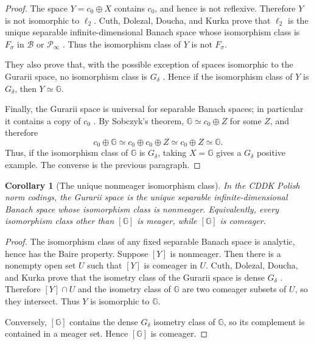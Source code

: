 \documentclass[11pt]{article}
\newtheorem*{corollary}{Corollary}
\begin{document}
\begin{proof}
The space \(Y=c_0\oplus X\) contains \(c_0\), and hence is not reflexive.
Therefore \(Y\) is not isomorphic to \(\ell_2\).  Cuth, Dolezal, Doucha, and
Kurka prove that \(\ell_2\) is the unique separable infinite-dimensional Banach
space whose isomorphism class is \(F_\sigma\) in \(\mathcal B\) or
\(\mathcal P_\infty\) \cite[Theorem 2.10]{CDDK}.  Thus the isomorphism class
of \(Y\) is not \(F_\sigma\).

They also prove that, with the possible exception of spaces isomorphic to the
Gurarii space, no isomorphism class is \(G_\delta\)
\cite[Proposition 2.11]{CDDK}.  Hence if the isomorphism class of \(Y\) is
\(G_\delta\), then \(Y\simeq\mathbb G\).

Finally, the Gurarii space is universal for separable Banach spaces; in
particular it contains a copy of \(c_0\) \cite{BKK}.  By Sobczyk's theorem,
\(\mathbb G\simeq c_0\oplus Z\) for some \(Z\), and therefore
\[
  c_0\oplus \mathbb G\simeq c_0\oplus c_0\oplus Z\simeq c_0\oplus Z\simeq
  \mathbb G.
\]
Thus, if the isomorphism class of \(\mathbb G\) is \(G_\delta\), taking
\(X=\mathbb G\) gives a \(G_\delta\) positive example.  The converse is the
previous paragraph.
\end{proof}

\begin{corollary}[The unique nonmeager isomorphism class]
In the CDDK Polish norm codings, the Gurarii space is the unique separable
infinite-dimensional Banach space whose isomorphism class is nonmeager.
Equivalently, every isomorphism class other than \([\mathbb G]\) is meager,
while \([\mathbb G]\) is comeager.
\end{corollary}

\begin{proof}
The isomorphism class of any fixed separable Banach space is analytic, hence
has the Baire property.  Suppose \([Y]\) is nonmeager.  Then there is a
nonempty open set \(U\) such that \([Y]\) is comeager in \(U\).  Cuth, Dolezal,
Doucha, and Kurka prove that the isometry class of the Gurarii space is dense
\(G_\delta\) \cite[Theorem 1.4(4)]{CDDK}.  Therefore \([Y]\cap U\) and the
isometry class of \(\mathbb G\) are two comeager subsets of \(U\), so they
intersect.  Thus \(Y\) is isomorphic to \(\mathbb G\).

Conversely, \([\mathbb G]\) contains the dense \(G_\delta\) isometry class of
\(\mathbb G\), so its complement is contained in a meager set.  Hence
\([\mathbb G]\) is comeager.
\end{proof}
\end{document}
